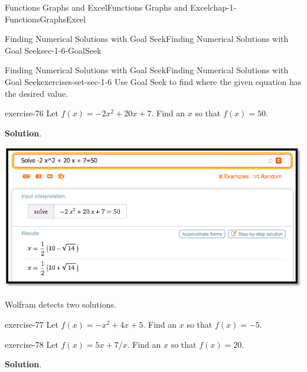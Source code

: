 \documentclass[oneside,10pt,]{book}
\numberwithin{equation}{section}
\begin{document}
\begin{chapterptx}{Functions Graphs and Excel}{}{Functions Graphs and Excel}{}{}{chap-1-FunctionsGraphsExcel}
\begin{sectionptx}{Finding Numerical Solutions with Goal Seek}{}{Finding Numerical Solutions with Goal Seek}{}{}{sec-1-6-GoalSeek}
\begin{exercises-subsection-numberless}{Finding Numerical Solutions with Goal Seek}{}{Finding Numerical Solutions with Goal Seek}{}{}{exercises-set-sec-1-6}
\hypertarget{p-502}{}%
Use Goal Seek to find where the given equation has the desired value.%
\begin{divisionexercise}{1}{}{}{exercise-76}%
\hypertarget{p-503}{}%
Let \(f(x) = -2 x^2 + 20 x + 7\).  Find an \(x\) so that \(f(x) = 50\).%
\par\smallskip%
\noindent\textbf{Solution}.\hypertarget{solution-36}{}\quad%
\hypertarget{p-504}{}%
\leavevmode%
\begin{sidebyside}{1}{0}{0}{0}%
\begin{sbspanel}{1}%
\includegraphics[width=1\linewidth]{images/sec1-6-sol1a.png}
\end{sbspanel}%
\end{sidebyside}%
 Wolfram detects two solutions.%
\end{divisionexercise}%
\begin{divisionexercise}{2}{}{}{exercise-77}%
\hypertarget{p-505}{}%
Let \(f(x) = -x^2 + 4 x + 5\).  Find an \(x\) so that \(f(x) = -5\).%
\end{divisionexercise}%
\begin{divisionexercise}{3}{}{}{exercise-78}%
\hypertarget{p-506}{}%
Let \(f(x) = 5 x + 7/x\).  Find an \(x\) so that \(f(x) = 20\).%
\par\smallskip%
\noindent\textbf{Solution}.\hypertarget{solution-37}{}\quad%
\hypertarget{p-507}{}%
\leavevmode%
\begin{sidebyside}{1}{0.2}{0.2}{0}%
\begin{sbspanel}{0.6}%

\end{sbspanel}
\end{sidebyside}
\end{divisionexercise}
\end{exercises-subsection-numberless}
\end{sectionptx}
\end{chapterptx}
\end{document}

